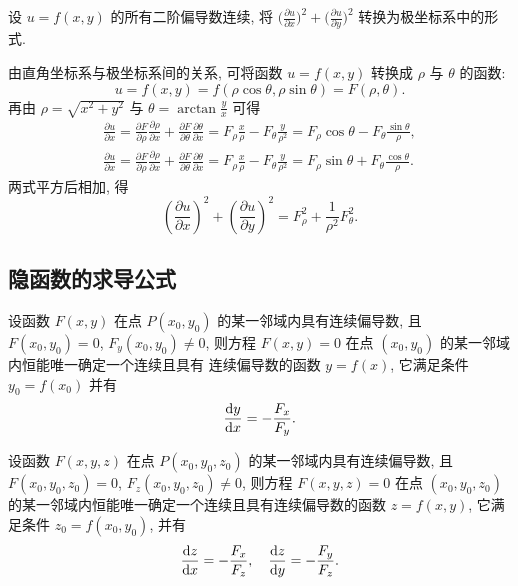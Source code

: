 \documentclass[a4paper,10pt,fleqn]{article}
\newcommand{\pdif}[2]{\frac{\partial #1}{\partial #2}}
\begin{document}
\begin{exmp}
    设 $u=f(x,y)$ 的所有二阶偏导数连续, 将 $\big(\pdif{u}{x}\big)^2+\big(\pdif{u}{y}\big)^2$ 转换为极坐标系中的形式.

    由直角坐标系与极坐标系间的关系, 可将函数 $u=f(x,y)$ 转换成 $\rho$ 与 $\theta$ 的函数:
    \[
        u=f(x,y)=f(\rho\cos\theta,\rho\sin\theta)=F(\rho,\theta).
    \]
    再由 $\rho=\sqrt{x^2+y^2}$ 与 $\theta=\arctan\frac{y}{x}$ 可得
    \begin{align*}
        \pdif{u}{x}=\pdif{F}{\rho}\pdif{\rho}{x}+\pdif{F}{\theta}\pdif{\theta}{x}=F_\rho\frac{x}{\rho}-F_\theta\frac{y}{\rho^2}=F_\rho\cos\theta-F_\theta\frac{\sin\theta}{\rho}, \\
        \pdif{u}{x}=\pdif{F}{\rho}\pdif{\rho}{x}+\pdif{F}{\theta}\pdif{\theta}{x}=F_\rho\frac{x}{\rho}-F_\theta\frac{y}{\rho^2}=F_\rho\sin\theta+F_\theta\frac{\cos\theta}{\rho}.
    \end{align*}
    两式平方后相加, 得
    \[
        \left(\pdif{u}{x}\right)^2+\left(\pdif{u}{y}\right)^2=F_\rho^2+\frac{1}{\rho^2}F_\theta^2.
    \]
\end{exmp}

\subsection{隐函数的求导公式}

\begin{thm_impl}
    设函数 $F(x,y)$ 在点 $P(x_0,y_0)$ 的某一邻域内具有连续偏导数, 且 $F(x_0,y_0)=0$,
    $F_y(x_0,y_0)\neq0$, 则方程 $F(x,y)=0$ 在点 $(x_0,y_0)$ 的某一邻域内恒能唯一确定一个连续且具有
    连续偏导数的函数 $y=f(x)$, 它满足条件 $y_0=f(x_0)$ 并有
    \[
        \frac{{\rm d}y}{{\rm d}x}=-\frac{F_x}{F_y}.
    \]
\end{thm_impl}

\begin{thm_impl}
    设函数 $F(x,y,z)$ 在点 $P(x_0,y_0,z_0)$ 的某一邻域内具有连续偏导数, 且\\
    $F(x_0,y_0,z_0)=0$, $F_z(x_0,y_0,z_0)\neq0$, 则方程 $F(x,y,z)=0$ 在点 $(x_0,y_0,z_0)$
    的某一邻域内恒能唯一确定一个连续且具有连续偏导数的函数 $z=f(x,y)$, 它满足条件 $z_0=f(x_0,y_0)$,
    并有
    \[
        \frac{{\rm d}z}{{\rm d}x}=-\frac{F_x}{F_z},\quad\frac{{\rm d}z}{{\rm d}y}=-\frac{F_y}{F_z}.
    \]
\end{thm_impl}
\end{document}
